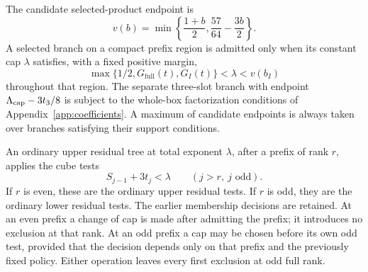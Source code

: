 The candidate selected-product endpoint is
\begin{equation}\label{sv:tent}
 v(b)=\min\left\{\frac{1+b}{2},\frac{57}{64}-\frac{3b}{2}\right\}.
\end{equation}
A selected branch on a compact prefix region is admitted only when
its constant cap $\lambda$ satisfies, with a fixed positive margin,
\begin{equation}\label{sv:branch-licence}
 \max\{1/2,G_{\mathrm{full}}(t),G_I(t)\}
       <\lambda<v(b_I)
\end{equation}
throughout that region.  The separate three-slot branch with endpoint
$\Lambda_{\rm cap}-3t_3/8$ is subject to the whole-box factorization conditions
of Appendix~\ref{app:coefficients}.  A maximum of candidate endpoints
is always taken over branches satisfying their support conditions.

An ordinary upper residual tree at total exponent $\lambda$, after
a prefix of rank $r$, applies the cube tests
\begin{equation}\label{sv:upper-cubes}
 S_{j-1}+3t_j<\lambda\qquad(j>r,\ j\text{ odd}).
\end{equation}
If $r$ is even, these are the ordinary upper residual tests.  If $r$
is odd, they are the ordinary lower residual tests.  The earlier
membership decisions are retained.  At an even prefix a change of cap
is made after admitting the prefix; it introduces no exclusion at that
rank.  At an odd prefix a cap may be chosen before its own odd test,
provided that the decision depends only on that prefix and the
previously fixed policy.  Either operation leaves every first
exclusion at odd full rank.

